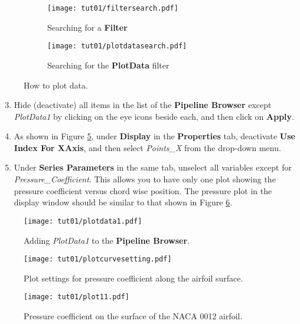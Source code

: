 \begin{figure}[ht]
    \centering
     \begin{subfigure}[b]{.4\textwidth}
         \centering
         \texttt{[image: tut01/filtersearch.pdf]}
         \caption{Searching for a \textbf{Filter}}
         \label{fig1:plotdata a}
     \end{subfigure}
     \hfill
     \begin{subfigure}[b]{.4\textwidth}
         \centering
         \texttt{[image: tut01/plotdatasearch.pdf]}
         \caption{Searching for the \textbf{PlotData} filter}
         \label{fig1:plotdata b}
     \end{subfigure}     
    \caption{How to plot data.}
    \label{fig1:plotdata}
\end{figure}
\begin{enumerate}[label=\arabic*)]
	\setcounter{enumi}{2}
	\item Hide (deactivate) all items in the list of the \textbf{Pipeline Browser} except \textit{PlotData1} by clicking on the eye icons beside each, and then click on \textbf{Apply}.
	\item As shown in Figure \ref{fig1:pointsx}, under \textbf{Display} in the \textbf{Properties} tab, deactivate \textbf{Use Index For XAxis}, and then select \textit{Points\_X} from the drop-down menu.
	\item Under \textbf{Series Parameters} in the same tab, unselect all variables except for \textit{Pressure\_Coefficient}. This allows you to have only one plot showing the pressure coefficient versus chord wise position. The pressure plot in the display window should be similar to that shown in Figure \ref{fig1:surface_pressure}.
\end{enumerate}
\begin{figure}[ht]
    \centering
    \texttt{[image: tut01/plotdata1.pdf]}
    \caption{Adding \textit{PlotData1} to the \textbf{Pipeline Browser}.}
    \label{fig1:plotdata-list}
\end{figure}
\begin{figure}[H]
    \centering
    \texttt{[image: tut01/plotcurvesetting.pdf]}
    \caption{Plot settings for pressure coefficient along the airfoil surface.}
    \label{fig1:pointsx}
\end{figure}
\begin{figure}[ht]
    \centering
    \texttt{[image: tut01/plot11.pdf]}
    \caption{Pressure coefficient on the surface of the NACA 0012 airfoil.}
    \label{fig1:surface_pressure}
\end{figure}
